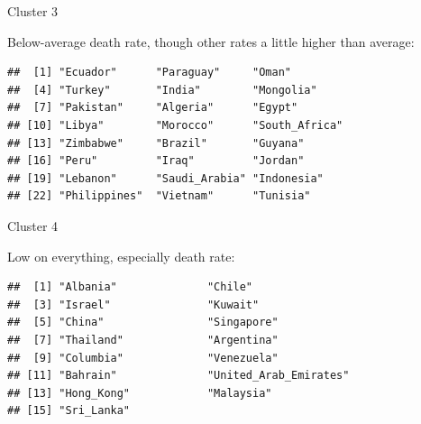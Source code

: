 \begin{frame}[fragile]{Cluster 3}

  Below-average death rate, though other rates a little higher than average:

  
\begin{knitrout}
\color{fgcolor}\begin{kframe}
\begin{alltt}
\hlstd{(vital.s,country[clus6}\hlopt{==}\hlstd{])}
\end{alltt}
\begin{verbatim}
##  [1] "Ecuador"      "Paraguay"     "Oman"        
##  [4] "Turkey"       "India"        "Mongolia"    
##  [7] "Pakistan"     "Algeria"      "Egypt"       
## [10] "Libya"        "Morocco"      "South_Africa"
## [13] "Zimbabwe"     "Brazil"       "Guyana"      
## [16] "Peru"         "Iraq"         "Jordan"      
## [19] "Lebanon"      "Saudi_Arabia" "Indonesia"   
## [22] "Philippines"  "Vietnam"      "Tunisia"
\end{verbatim}
\end{kframe}
\end{knitrout}
  
\end{frame}
\begin{frame}[fragile]{Cluster 4}

    Low on everything, especially death rate:

  
\begin{knitrout}
\color{fgcolor}\begin{kframe}
\begin{alltt}
\hlstd{(vital.s,country[clus6}\hlopt{==}\hlstd{])}
\end{alltt}
\begin{verbatim}
##  [1] "Albania"              "Chile"               
##  [3] "Israel"               "Kuwait"              
##  [5] "China"                "Singapore"           
##  [7] "Thailand"             "Argentina"           
##  [9] "Columbia"             "Venezuela"           
## [11] "Bahrain"              "United_Arab_Emirates"
## [13] "Hong_Kong"            "Malaysia"            
## [15] "Sri_Lanka"
\end{verbatim}
\end{kframe}
\end{knitrout}
  
\end{frame}
